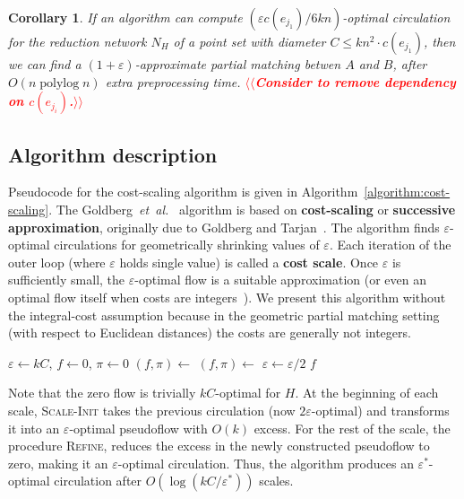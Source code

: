 \documentclass[11pt]{article}
\makeatletter
\def\etal{\textit{et~al.}}
\def\polylog{\mathop{\mathrm{polylog}}}
\def\eps{\varepsilon}
\theoremstyle{plain}
\newtheorem{corollary}[lemma]{Corollary}
\numberwithin{figure}{section}
\def\EMPH#1{\textbf{\boldmath #1}}
\def\n@te#1{\textsf{\boldmath \textbf{$\langle\!\langle$#1$\rangle\!\rangle$}}\leavevmode}
\def\note#1{\textcolor{red}{\n@te{#1}}}
\makeatother
\begin{document}
\begin{corollary}
\label{corollary:cost_scale_approx}
If an algorithm can compute $(\eps c(e_{j_1})/6kn)$-optimal circulation for the
reduction network $N_H$ of a point set with diameter
$C \leq kn^2 \cdot c(e_{j_1})$, then we can find a $(1+\eps)$-approximate
partial matching betwen $A$ and $B$, after $O(n\polylog n)$ extra preprocessing time. \note{Consider to remove dependency on $c(e_{j_i})$.}
\end{corollary}

\subsection{Algorithm description}

Pseudocode for the cost-scaling algorithm is given in
Algorithm~\ref{algorithm:cost-scaling}.
The Goldberg~{\etal}~\cite{GHKT17} algorithm is based on \EMPH{cost-scaling} or
\EMPH{successive approximation}, originally due to Goldberg and
Tarjan~\cite{GT90}.
The algorithm finds $\eps$-optimal circulations for geometrically shrinking
values of $\eps$.
Each iteration of the outer loop (where $\eps$ holds single value) is called a
\EMPH{cost scale}.
Once $\eps$ is sufficiently small, the $\eps$-optimal flow is a suitable
approximation (or even an optimal flow itself when costs are integers~\cite{GT90,GHKT17}).
We present this algorithm without the integral-cost assumption because in the geometric
partial matching setting (with respect to Euclidean distances) the costs are generally not integers.

\begin{figure*}[h]
\centering
\begin{minipage}{.5\linewidth}
\begin{algorithm}[H]
\caption{Cost-Scaling MCF}
\label{algorithm:cost-scaling}
\begin{algorithmic}[1]
\Function{MCF}{$H$, $\eps^*$}
	\State $\eps \gets kC$,
	$f \gets 0$,
	$\pi \gets 0$
	\While{$\eps > \eps^*/6$}
		\State $(f, \pi) \gets$ 
		\State $(f, \pi) \gets$ 
		\State $\eps \gets \eps/2$
	\EndWhile
	\State\Return $f$
\EndFunction
\end{algorithmic}
\end{algorithm}
\end{minipage}
\end{figure*}

Note that the zero flow is trivially $kC$-optimal for $H$.
At the beginning of each scale, \textsc{Scale-Init} takes the previous
circulation (now $2\eps$-optimal) and transforms it into an $\eps$-optimal
pseudoflow with $O(k)$ excess.
For the rest of the scale, the procedure \textsc{Refine}, reduces the excess in
the newly constructed pseudoflow to zero, making it an $\eps$-optimal
circulation.
Thus, the algorithm produces an $\eps^*$-optimal circulation after
$O(\log(kC/\eps^*))$ scales.
\end{document}
